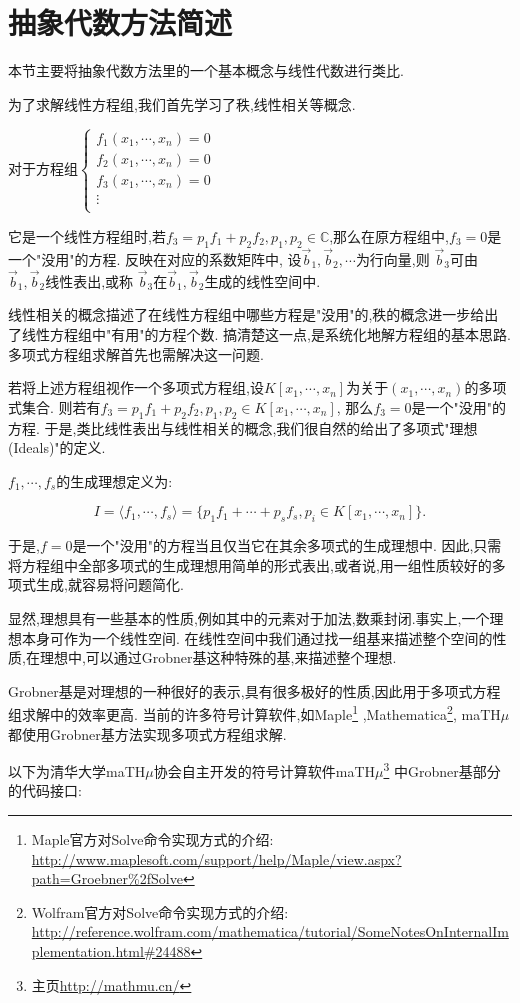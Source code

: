 \section{抽象代数方法简述}
	本节主要将抽象代数方法里的一个基本概念与线性代数进行类比.

	为了求解线性方程组,我们首先学习了秩,线性相关等概念.

	对于方程组$ \begin{cases}
		f_1(x_1,\cdots,x_n)=0\\
		f_2(x_1,\cdots,x_n)=0\\
		f_3(x_1,\cdots,x_n)=0\\
		\vdots\\
	\end{cases}$
	
	它是一个线性方程组时,若$ f_3=p_1f_1+p_2f_2,p_1,p_2\in \mathbb{C}$,那么在原方程组中,$ f_3=0$是一个"没用"的方程.
	反映在对应的系数矩阵中,
	设$ \overrightarrow b_1,\overrightarrow b_2,\cdots $为行向量,则
	$ \overrightarrow b_3$可由$ \overrightarrow b_1,\overrightarrow b_2$线性表出,或称
	$ \overrightarrow b_3$在$ \overrightarrow b_1,\overrightarrow b_2$生成的线性空间中.

	线性相关的概念描述了在线性方程组中哪些方程是"没用"的,秩的概念进一步给出了线性方程组中"有用"的方程个数.
	搞清楚这一点,是系统化地解方程组的基本思路.
	多项式方程组求解首先也需解决这一问题.

	若将上述方程组视作一个多项式方程组,设$ K[x_1,\cdots, x_n]$为关于$ (x_1,\cdots , x_n)$的多项式集合.
	则若有$ f_3 = p_1f_1 + p_2f_2,p_1,p_2\in K[x_1,\cdots, x_n]$,
	那么$ f_3=0$是一个"没用"的方程.  
	于是,类比线性表出与线性相关的概念,我们很自然的给出了多项式"理想(Ideals)"的定义.

	$ f_1,\cdots,f_s $的生成理想定义为: 

\[ I=\langle f_1,\cdots,f_s \rangle = \{p_1f_1+\cdots+p_sf_s,p_i\in K[x_1,\cdots,x_n]\}.\]

	于是,$ f=0$是一个"没用"的方程当且仅当它在其余多项式的生成理想中.
	因此,只需将方程组中全部多项式的生成理想用简单的形式表出,或者说,用一组性质较好的多项式生成,就容易将问题简化.

	显然,理想具有一些基本的性质,例如其中的元素对于加法,数乘封闭.事实上,一个理想本身可作为一个线性空间.
	在线性空间中我们通过找一组基来描述整个空间的性质,在理想中,可以通过Grobner基这种特殊的基,来描述整个理想.

	Grobner基是对理想的一种很好的表示,具有很多极好的性质,因此用于多项式方程组求解中的效率更高.
	当前的许多符号计算软件,如Maple\footnote{Maple官方对Solve命令实现方式的介绍:
		\url{http://www.maplesoft.com/support/help/Maple/view.aspx?path=Groebner\%2fSolve}}
	,Mathematica\footnote{Wolfram官方对Solve命令实现方式的介绍:
		\url{http://reference.wolfram.com/mathematica/tutorial/SomeNotesOnInternalImplementation.html\#24488}},
	maTH$ \mu$都使用Grobner基方法实现多项式方程组求解.

	以下为清华大学maTH$ \mu$协会自主开发的符号计算软件maTH$ \mu$\footnote{主页\url{http://mathmu.cn/}} 中Grobner基部分的代码接口:

